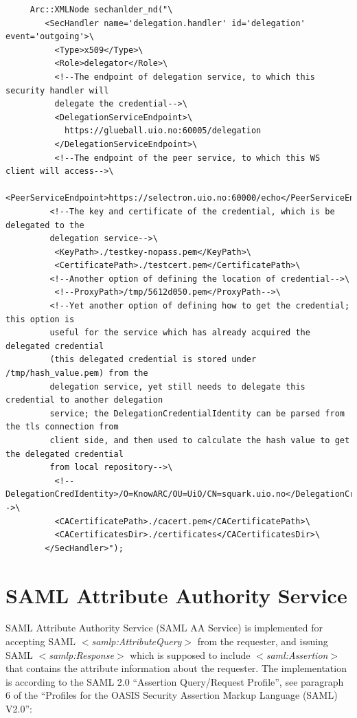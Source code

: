 \documentclass{article}                            %
\begin{document}
\begin{verbatim}
     Arc::XMLNode sechanlder_nd("\
        <SecHandler name='delegation.handler' id='delegation' event='outgoing'>\
          <Type>x509</Type>\
          <Role>delegator</Role>\
          <!--The endpoint of delegation service, to which this security handler will
          delegate the credential-->\
          <DelegationServiceEndpoint>\
            https://glueball.uio.no:60005/delegation
          </DelegationServiceEndpoint>\
          <!--The endpoint of the peer service, to which this WS client will access-->\
          <PeerServiceEndpoint>https://selectron.uio.no:60000/echo</PeerServiceEndpoint>\
         <!--The key and certificate of the credential, which is be delegated to the
         delegation service-->\
          <KeyPath>./testkey-nopass.pem</KeyPath>\
          <CertificatePath>./testcert.pem</CertificatePath>\
         <!--Another option of defining the location of credential-->\
          <!--ProxyPath>/tmp/5612d050.pem</ProxyPath-->\
         <!--Yet another option of defining how to get the credential; this option is
         useful for the service which has already acquired the delegated credential
         (this delegated credential is stored under /tmp/hash_value.pem) from the
         delegation service, yet still needs to delegate this credential to another delegation
         service; the DelegationCredentialIdentity can be parsed from the tls connection from
         client side, and then used to calculate the hash value to get the delegated credential
         from local repository-->\
          <!--DelegationCredIdentity>/O=KnowARC/OU=UiO/CN=squark.uio.no</DelegationCredIdentity-->\
          <CACertificatePath>./cacert.pem</CACertificatePath>\
          <CACertificatesDir>./certificates</CACertificatesDir>\
        </SecHandler>");
\end{verbatim}




\section{SAML Attribute Authority Service} %
\label{sec:saml_aa_service}
SAML Attribute Authority Service (SAML AA Service) is implemented for accepting SAML \textit{$<$samlp:AttributeQuery$>$} from the requester, and issuing SAML \textit{$<$samlp:Response$>$} which is supposed to include \textit{$<$saml:Assertion$>$} that contains the attribute information about the requester. The implementation is according to the SAML 2.0 ``Assertion Query/Request Profile'', see paragraph 6 of the ``Profiles for the OASIS Security Assertion Markup Language (SAML) V2.0'':
\end{document}
